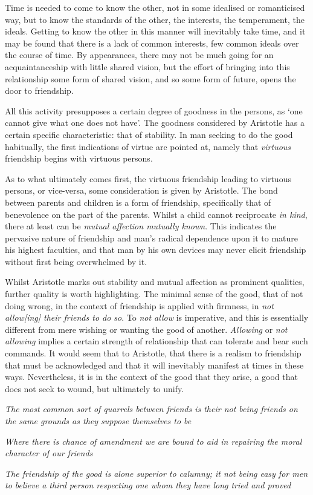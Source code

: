 \documentclass[a4paper,10pt]{article}
\begin{document}
Time is needed to come to know the other, not in some idealised or romanticised way, but to know the standards of the other, the interests, the temperament, the ideals. Getting to know the other in this manner will inevitably take time, and it may be found that there is a lack of common interests, few common ideals over the course of time. By appearances, there may not be much going for an acquaintanceship with little shared vision, but the effort of bringing into this relationship some form of shared vision, and so some form of future, opens the door to friendship.

All this activity presupposes a certain degree of goodness in the persons, as `one cannot give what one does not have'. The goodness considered by Aristotle has a certain specific characteristic: that of stability. In man seeking to do the good habitually, the first indications of virtue are pointed at, namely that \emph{virtuous} friendship begins with virtuous persons.

As to what ultimately comes first, the virtuous friendship leading to virtuous persons, or vice-versa, some consideration is given by Aristotle. The bond between parents and children is a form of friendship, specifically that of benevolence on the part of the parents. Whilst a child cannot reciprocate \emph{in kind}, there at least can be \emph{mutual affection mutually known}. This indicates the pervasive nature of friendship and man's radical dependence upon it to mature his highest faculties, and that man by his own devices may never elicit friendship without first being overwhelmed by it.

Whilst Aristotle marks out stability and mutual affection as prominent qualities, further quality is worth highlighting. The minimal sense of the good, that of not doing wrong, in the context of friendship is applied with firmness, in \emph{not allow[ing] their friends to do so}. To \emph{not allow} is imperative, and this is essentially different from mere wishing or wanting the good of another. \emph{Allowing} or \emph{not allowing} implies a certain strength of relationship that can tolerate and bear such commands. It would seem that to Aristotle, that there is a realism to friendship that must be acknowledged and that it will inevitably manifest at times in these ways. Nevertheless, it is in the context of the good that they arise, a good that does not seek to wound, but ultimately to unify.


\epigraph{\textit{The most common sort of quarrels between friends is their not being friends on the same grounds as they suppose themselves to be}}{}
\vspace{-8mm}
\epigraph{\textit{Where there is chance of amendment we are bound to aid in repairing the moral character of our friends}}{}
\vspace{-8mm}
\epigraph{\textit{The friendship of the good is alone superior to calumny; it not being easy for men to believe a third person respecting one whom they have long tried and proved}}{}
\end{document}
